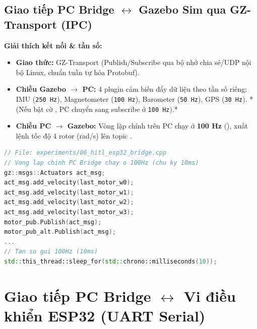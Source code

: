\documentclass[11pt,a4paper]{article}
\begin{document}
\subsection{Giao tiếp PC Bridge $\leftrightarrow$ Gazebo Sim qua GZ-Transport (IPC)}
\noindent
\begin{minipage}[t]{0.45\textwidth}
\vspace{0pt}
\textbf{Giải thích kết nối \& tần số:}
\begin{itemize}
    \item \textbf{Giao thức:} GZ-Transport (Publish/Subscribe qua bộ nhớ chia sẻ/UDP nội bộ Linux, chuẩn tuần tự hóa Protobuf).
    \item \textbf{Chiều Gazebo $\rightarrow$ PC:} 4 plugin cảm biến đẩy dữ liệu theo tần số riêng: IMU (\texttt{250 Hz}), Magnetometer (\texttt{100 Hz}), Barometer (\texttt{50 Hz}), GPS (\texttt{30 Hz}). *(Nếu bật cờ , PC chuyển sang subscribe  ở \texttt{100 Hz}).*
    \item \textbf{Chiều PC $\rightarrow$ Gazebo:} Vòng lặp chính trên PC chạy ở \textbf{100 Hz} (), xuất lệnh tốc độ 4 rotor  (rad/s) lên topic .
\end{itemize}
\end{minipage}
\hfill
\begin{minipage}[t]{0.52\textwidth}
\vspace{0pt}
\begin{lstlisting}[language=C++, firstnumber=1950]
// File: experiments/06_hitl_esp32_bridge.cpp
// Vong lap chinh PC Bridge chay o 100Hz (chu ky 10ms)
gz::msgs::Actuators act_msg;
act_msg.add_velocity(last_motor_w0);
act_msg.add_velocity(last_motor_w1);
act_msg.add_velocity(last_motor_w2);
act_msg.add_velocity(last_motor_w3);
motor_pub.Publish(act_msg);
motor_pub_alt.Publish(act_msg);
...
// Tan so gui 100Hz (10ms)
std::this_thread::sleep_for(std::chrono::milliseconds(10));
\end{lstlisting}
\end{minipage}

\newpage

\section{Giao tiếp PC Bridge $\leftrightarrow$ Vi điều khiển ESP32 (UART Serial)}
\end{document}
